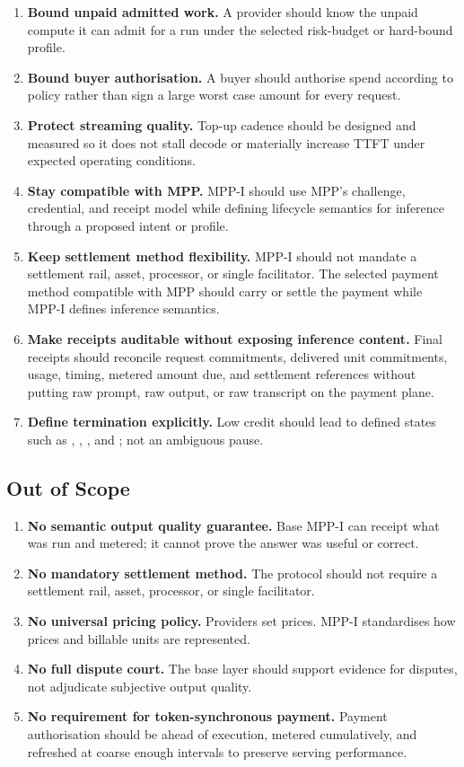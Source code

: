 \documentclass[11pt]{article}
\newcommand{\field}[1]{\texttt{\detokenize{#1}}}
\newcommand{\mppi}{MPP-I}
\begin{document}
\begin{enumerate}
  \item \textbf{Bound unpaid admitted work.} A provider should know the unpaid compute it can admit for a run under the selected risk-budget or hard-bound profile.
  \item \textbf{Bound buyer authorisation.} A buyer should authorise spend according to policy rather than sign a large worst case amount for every request.
  \item \textbf{Protect streaming quality.} Top-up cadence should be designed and measured so it does not stall decode or materially increase TTFT under expected operating conditions.
  \item \textbf{Stay compatible with MPP.} \mppi{} should use MPP's challenge, credential, and receipt model while defining lifecycle semantics for inference through a proposed \field{inference} intent or profile.
  \item \textbf{Keep settlement method flexibility.} \mppi{} should not mandate a settlement rail, asset, processor, or single facilitator. The selected payment method compatible with MPP should carry or settle the payment while \mppi{} defines inference semantics.
  \item \textbf{Make receipts auditable without exposing inference content.} Final receipts should reconcile request commitments, delivered unit commitments, usage, timing, metered amount due, and settlement references without putting raw prompt, raw output, or raw transcript on the payment plane.
  \item \textbf{Define termination explicitly.} Low credit should lead to defined states such as \field{low_credit}, \field{draining}, \field{stopped}, and \field{settled}; not an ambiguous pause.
\end{enumerate}

\subsection{Out of Scope}

\begin{enumerate}
  \item \textbf{No semantic output quality guarantee.} Base \mppi{} can receipt what was run and metered; it cannot prove the answer was useful or correct.
  \item \textbf{No mandatory settlement method.} The protocol should not require a settlement rail, asset, processor, or single facilitator.
  \item \textbf{No universal pricing policy.} Providers set prices. \mppi{} standardises how prices and billable units are represented.
  \item \textbf{No full dispute court.} The base layer should support evidence for disputes, not adjudicate subjective output quality.
  \item \textbf{No requirement for token-synchronous payment.} Payment authorisation should be ahead of execution, metered cumulatively, and refreshed at coarse enough intervals to preserve serving performance.
\end{enumerate}
\end{document}
